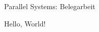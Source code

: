 \documentclass[
    twosided=false,
    paper=a4,
    fontsize=12pt,
    ngerman,
    version=3.10b,
    listof=totoc,
    bibliography=totoc
]{scrreprt}
\newcommand{\shorttitle}{Parallel Systems: Belegarbeit}
\begin{document}
    \shorttitle
    \par
    Hello, World!
\end{document}
